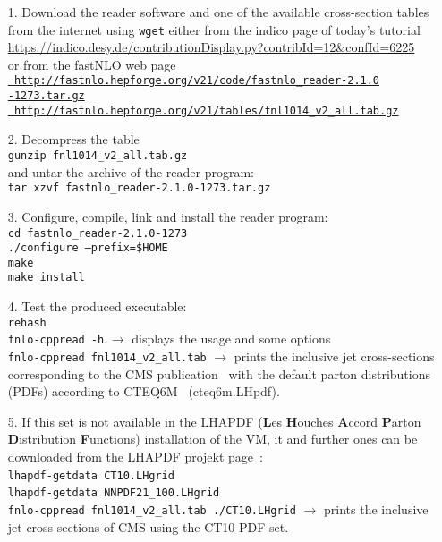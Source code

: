 \documentclass[12pt,a4paper,twoside]{article}
\begin{document}
\begin{itemize}
\item[1.] Download the \FASTNLO reader software and one of the
  available \FASTNLO cross-section tables from the internet
  using {\tt wget} either from the indico page of today's tutorial\\
  \href{https://indico.desy.de/contributionDisplay.py?contribId=12&confId=6225}
  {https://indico.desy.de/contributionDisplay.py?contribId=12\&confId=6225}\\
  or from the fastNLO web page\\
  \href{http://fastnlo.hepforge.org/v21/code/fastnlo_reader-2.1.0-1273.tar.gz}{\tt
    http://fastnlo.hepforge.org/v21/code/fastnlo\_reader-2.1.0\\-1273.tar.gz}\\
  \href{http://fastnlo.hepforge.org/v21/tables/fnl1014_v2_all.tab.gz}{\tt
    http://fastnlo.hepforge.org/v21/tables/fnl1014\_v2\_all.tab.gz}
\item[2.] Decompress the \FASTNLO table\\
  {\tt  gunzip fnl1014\_v2\_all.tab.gz}\\
  and untar the archive of the reader program:\\
  {\tt tar xzvf fastnlo\_reader-2.1.0-1273.tar.gz}
\item[3.] Configure, compile, link and install the reader
  program:\\
  {\tt cd fastnlo\_reader-2.1.0-1273}\\
  {\tt ./configure --prefix=\$HOME}\\
  {\tt make}\\
  {\tt make install}
\item[4.] Test the produced executable:\\
  {\tt rehash}\\
  {\tt fnlo-cppread -h} $\rightarrow$ displays the usage and some options\\
  {\tt fnlo-cppread fnl1014\_v2\_all.tab} $\rightarrow$ prints the
  inclusive jet cross-sections corresponding to the CMS
  publication~\cite{CMS-PAP-QCD-10-011} with the default parton
  distributions (PDFs) according to CTEQ6M~\cite{Pumplin:2002vw}
  (cteq6m.LHpdf).
\item[5.] If this set is not available in the LHAPDF ({\bf L}es {\bf
    H}ouches {\bf A}ccord {\bf P}arton {\bf D}istribution {\bf
    F}unctions) installation of the VM, it and further ones
  can be downloaded from the LHAPDF projekt page~\cite{Whalley:2005nh}:\\
  {\tt lhapdf-getdata CT10.LHgrid}~\cite{Lai:2010vv}\\
  {\tt lhapdf-getdata NNPDF21\_100.LHgrid}~\cite{Ball:2011mu}\\
  {\tt fnlo-cppread fnl1014\_v2\_all.tab ./CT10.LHgrid} $\rightarrow$
  prints the inclusive jet cross-sections of CMS using the CT10 PDF
  set.
\end{itemize}
\end{document}
